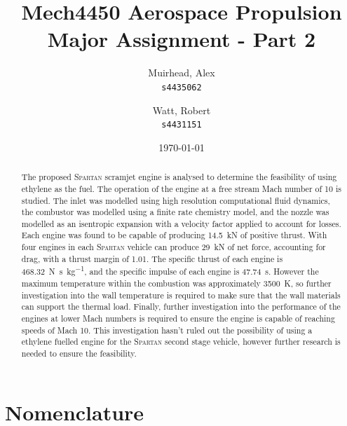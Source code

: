 \documentclass[a4paper]{article}
\title{
	\Large {\sc Mech}4450 Aerospace Propulsion \\
	\Huge Major Assignment - Part 2
}
\author{
	Muirhead, Alex \\ \texttt{s4435062}
	\and
	Watt, Robert \\ \texttt{s4431151}
}
\date{\today}
\begin{document}
\maketitle

\vfill

\begin{abstract}
    The proposed \textsc{Spartan} scramjet engine is analysed to determine the feasibility of using ethylene as the fuel. The operation of the engine at a free stream Mach number of 10 is studied. The inlet was modelled using high resolution computational fluid dynamics, the combustor was modelled using a finite rate chemistry model, and the nozzle was modelled as an isentropic expansion with a velocity factor applied to account for losses. Each engine was found to be capable of producing 14.5~kN of positive thrust. With four engines in each \textsc{Spartan} vehicle can produce 29~kN of net force, accounting for drag, with a thrust margin of 1.01. The specific thrust of each engine is \SI{468.32}{\N \s \per \kg}, and the specific impulse of each engine is \SI{47.74}{\s}. However the maximum temperature within the combustion was approximately 3500~K, so further investigation into the wall temperature is required to make sure that the wall materials can support the thermal load. Finally, further investigation into the performance of the engines at lower Mach numbers is required to ensure the engine is capable of reaching speeds of Mach 10. This investigation hasn't ruled out the possibility of using a ethylene fuelled engine for the \textsc{Spartan} second stage vehicle, however further research is needed to ensure the feasibility. 
\end{abstract}


\vspace{10em}

\newpage

\tableofcontents
{}
\newpage
\section*{Nomenclature}
\end{document}
